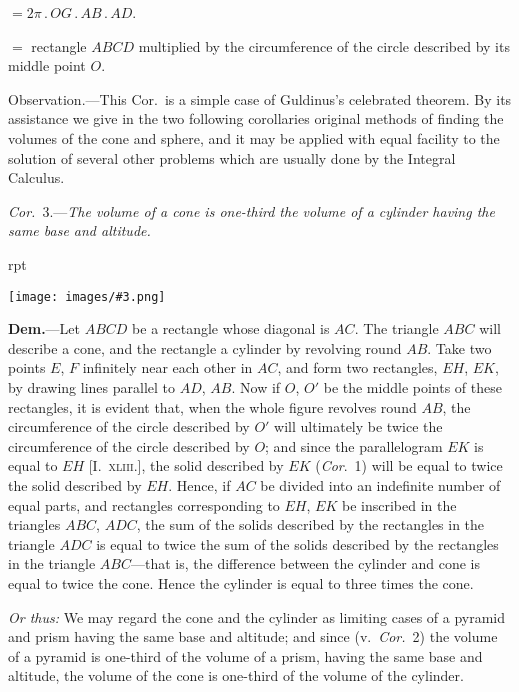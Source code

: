\documentclass[oneside]{book}
\newcounter{wrapwidth}
\newcommand\imgflow[3]{
\setcounter{wrapwidth}{#1}
\begin{wrapfigure}[#2]{r}{\value{wrapwidth}pt}
\begin{center}
\vspace{-0.3in}
\texttt{[image: images/\#3.png]}
\end{center}
\end{wrapfigure}
}
\begin{document}
\hspace{.25\textwidth}$= 2\pi\,.\,OG\,.\,AB\,.\,AD$.

\hspace{.25\textwidth}$=$ rectangle $ABCD$ multiplied by the
circumference of the circle described by its middle
point $O$.

\smallskip
\begin{footnotesize}
\textsf{Observation.}---This Cor.\ is a simple case of Guldinus's celebrated
theorem. By its assistance we give in the two following
corollaries original methods of finding the volumes of the cone and
sphere, and it may be applied with equal facility to the solution
of several other problems which are usually done by the Integral
Calculus.
\par\end{footnotesize}

\smallskip
\emph{Cor.}~3.---\textit{The volume of a cone is one-third the volume
of a cylinder having the same base and altitude.}

\imgflow{160}{9}{f246}

\textbf{Dem.}---Let $ABCD$ be a rectangle whose diagonal is
$AC$. The triangle $ABC$ will describe a cone, and the
rectangle a cylinder by revolving round $AB$. Take two
points $E$, $F$ infinitely
near each other in $AC$,
and form two rectangles,
$EH$, $EK$, by drawing
lines parallel to $AD$, $AB$.
Now if $O$, $O'$ be the
middle points of these
rectangles, it is evident
that, when the whole
figure revolves round $AB$, the circumference of the
circle described by $O'$ will ultimately be twice the circumference
of the circle described by $O$; and since the
parallelogram $EK$ is equal to $EH$ [I.~\textsc{xliii}.], the solid
described by $EK$ (\emph{Cor}.~1) will be equal to twice the
solid described by $EH$. Hence, if $AC$ be divided into
an indefinite number of equal parts, and rectangles
corresponding to $EH$, $EK$ be inscribed in the triangles
$ABC$, $ADC$, the sum of the solids described by the
rectangles in the triangle $ADC$ is equal to twice the
sum of the solids described by the rectangles in the
triangle $ABC$---that is, the difference between the
cylinder and cone is equal to twice the cone. Hence
the cylinder is equal to three times the cone.

\begin{footnotesize}
\emph{Or thus:} We may regard the cone and the cylinder as limiting
cases of a pyramid and prism having the same base and altitude;
and since (v.\ \emph{Cor.}~2) the volume of a pyramid is one-third of the
volume of a prism, having the same base and altitude, the volume
of the cone is one-third of the volume of the cylinder.
\par\end{footnotesize}
\end{document}
